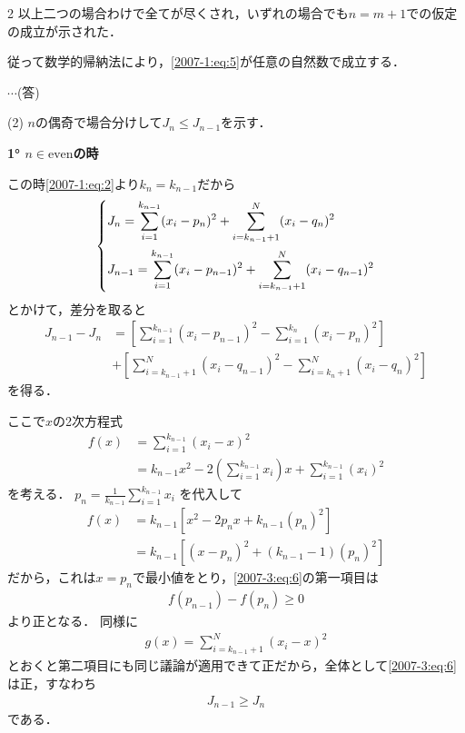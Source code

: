 \documentclass[../../../../main.tex]{subfiles}
\begin{document}
\begin{multicols}{2}
  \vspace{5pt}
  以上二つの場合わけで全てが尽くされ，いずれの場合でも$n=m+1$での仮定の成立が示された．

  従って数学的帰納法により，\cref{2007-1:eq:5}が任意の自然数で成立する．

  $\cdots$(答)
  \vspace{10pt}

  (2)
  $n$の偶奇で場合分けして$J_n \le J_{n-1}$を示す．

  \vspace{5pt}
  \textbf{1° $n \in \text{even}$の時}

  この時\cref{2007-1:eq:2}より$k_n = k_{n-1}$だから
  \begin{align*}
    \begin{dcases}
      J_n     = \sum_{i=1}^{k_{n-1}} (x_i-p_n)^2     + \sum_{i=k_{n-1}+1}^{N} (x_i-q_n)^2 \\
      J_{n-1} = \sum_{i=1}^{k_{n-1}} (x_i-p_{n-1})^2 + \sum_{i=k_{n-1}+1}^{N} (x_i-q_{n-1})^2
    \end{dcases}
  \end{align*}
  とかけて，差分を取ると
  \begin{align*}
    J_{n-1}-J_n
     & = \left[ \sum_{i=1}^{k_{n-1}} (x_i-p_{n-1})^2 - \sum_{i=1}^{k_n} (x_i-p_n)^2 \right]     \\
     & + \left[ \sum_{i=k_{n-1}+1}^{N} (x_i-q_{n-1})^2 - \sum_{i=k_n+1}^{N} (x_i-q_n)^2 \right]
    \label{2007-3:eq:6}
  \end{align*}
  を得る．

  ここで$x$の2次方程式
  \begin{align*}
    f(x)
     & = \sum_{i=1}^{k_{n-1}} (x_i-x)^2                                                          \\
     & = k_{n-1}x^2 - 2 \left( \sum_{i=1}^{k_{n-1}} x_i \right) x + \sum_{i=1}^{k_{n-1}} (x_i)^2
  \end{align*}
  を考える．
  $p_n = \frac{1}{k_{n-1}} \sum_{i=1}^{k_{n-1}} x_i$ を代入して
  \begin{align*}
    f(x)
     & = k_{n-1}\left[x^2-2p_nx+k_{n-1}(p_{n})^2\right]      \\
     & = k_{n-1}\left[(x-p_n)^2+(k_{n-1}-1)(p_{n})^2 \right]
  \end{align*}
  だから，これは$x=p_{n}$で最小値をとり，\cref{2007-3:eq:6}の第一項目は
  \begin{align*}
    f(p_{n-1})-f(p_{n}) \ge 0
  \end{align*}
  より正となる．
  同様に
  \begin{align*}
    g(x) = \sum_{i=k_{n-1}+1}^{N} (x_i-x)^2
  \end{align*}
  とおくと第二項目にも同じ議論が適用できて正だから，全体として\cref{2007-3:eq:6}は正，すなわち
  \begin{align*}
    J_{n-1} \ge J_{n}
  \end{align*}
  である．



\end{multicols}
\end{document}

